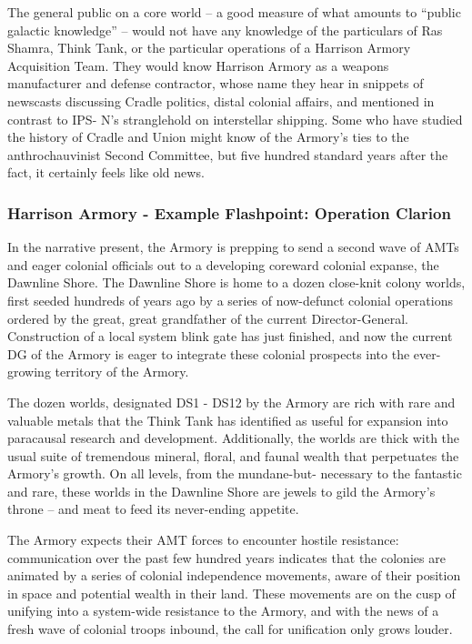 The general public on a core world -- a good measure of what amounts to ``public galactic
knowledge'' -- would not have any knowledge of the particulars of Ras Shamra, Think Tank, or
the particular operations of a Harrison Armory Acquisition Team. They would know Harrison
Armory as a weapons manufacturer and defense contractor, whose name they hear in snippets
of newscasts discussing Cradle politics, distal colonial affairs, and mentioned in contrast to IPS-
N's stranglehold on interstellar shipping. Some who have studied the history of Cradle and Union
might know of the Armory's ties to the anthrochauvinist Second Committee, but five hundred
standard years after the fact, it certainly feels like old news.

\subsubsection[Example Flashpoint: Operation Clarion]{Harrison Armory - Example Flashpoint: Operation Clarion  }

In the narrative present, the Armory is prepping to send a second wave of AMTs and eager
colonial officials out to a developing coreward colonial expanse, the Dawnline Shore. The
Dawnline Shore is home to a dozen close-knit colony worlds, first seeded hundreds of years ago
by a series of now-defunct colonial operations ordered by the great, great grandfather of the
current Director-General. Construction of a local system blink gate has just finished, and now the
current DG of the Armory is eager to integrate these colonial prospects into the ever-growing
territory of the Armory.

The dozen worlds, designated DS1 - DS12 by the Armory are rich with rare and valuable metals
that the Think Tank has identified as useful for expansion into paracausal research and
development. Additionally, the worlds are thick with the usual suite of tremendous mineral, floral,
and faunal wealth that perpetuates the Armory's growth. On all levels, from the mundane-but-
necessary to the fantastic and rare, these worlds in the Dawnline Shore are jewels to gild the
Armory's throne -- and meat to feed its never-ending appetite.

The Armory expects their AMT forces to encounter hostile resistance: communication over the
past few hundred years indicates that the colonies are animated by a series of colonial
independence movements, aware of their position in space and potential wealth in their land.
These movements are on the cusp of unifying into a system-wide resistance to the Armory, and
with the news of a fresh wave of colonial troops inbound, the call for unification only grows
louder.


